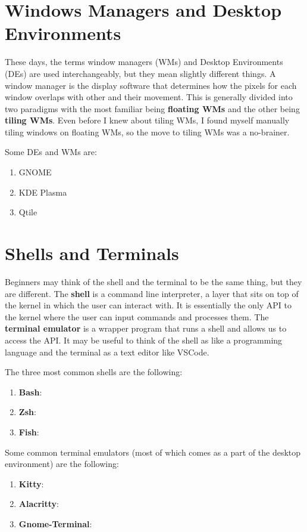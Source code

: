 \documentclass{article}
\begin{document}
\section{Windows Managers and Desktop Environments}

  These days, the terms window managers (WMs) and Desktop Environments (DEs) are used interchangeably, but they mean slightly different things. A window manager is the display software that determines how the pixels for each window overlaps with other and their movement. This is generally divided into two paradigms with the most familiar being \textbf{floating WMs} and the other being \textbf{tiling WMs}. Even before I knew about tiling WMs, I found myself manually tiling windows on floating WMs, so the move to tiling WMs was a no-brainer. 
  
  Some DEs and WMs are: 
  \begin{enumerate}
    \item GNOME 
    \item KDE Plasma
    \item Qtile
  \end{enumerate}

\section{Shells and Terminals}

  Beginners may think of the shell and the terminal to be the same thing, but they are different. The \textbf{shell} is a command line interpreter, a layer that sits on top of the kernel in which the user can interact with. It is essentially the only API to the kernel where the user can input commands and processes them. The \textbf{terminal emulator} is a wrapper program that runs a shell and allows us to access the API. It may be useful to think of the shell as like a programming language and the terminal as a text editor like VSCode. 

  The three most common shells are the following: 
  \begin{enumerate}
    \item \textbf{Bash}: 
    \item \textbf{Zsh}: 
    \item \textbf{Fish}:  
  \end{enumerate}

  Some common terminal emulators (most of which comes as a part of the desktop environment) are the following: 
  \begin{enumerate}
    \item \textbf{Kitty}: 
    \item \textbf{Alacritty}: 
    \item \textbf{Gnome-Terminal}: 
  \end{enumerate}
\end{document}
